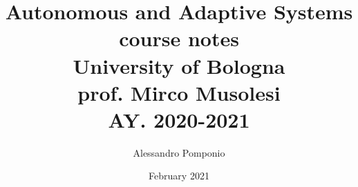 \usepackage[utf8]{inputenc}
\usepackage{amsmath}
\usepackage{amssymb}
\usepackage{parskip}                    %
\usepackage{verbatim}
\usepackage{graphicx}
\usepackage{hyperref}                   %
\usepackage{wrapfig}                    %
\usepackage{afterpage}                  %
\usepackage{bbm}                        %
\usepackage{bm}                         %
\usepackage{caption}                    %
\usepackage{subfigure}                  %
\usepackage{tocbibind}                  %
\usepackage[
    backend=biber,
    style=alphabetic,
    sorting=ynt
]{biblatex}

\usepackage[ruled,vlined,dotocloa]{algorithm2e}

\newcommand\addemptypage{       %
    \null
    \thispagestyle{empty}
    \addtocounter{page}{-1}
    \newpage
    }

\newcommand{\source}[1]{\vspace{-5pt} \caption*{ Source: {#1}} }

\DeclareMathOperator*{\argmax}{argmax}



\graphicspath{ {./Images/} }

\title{Autonomous and Adaptive Systems \\
        course notes\\
        University of Bologna \\
        \large	 prof. Mirco Musolesi \\
        AY. 2020-2021}
\author{Alessandro Pomponio}
\date{February 2021}



\maketitle
\clearpage
\addemptypage

